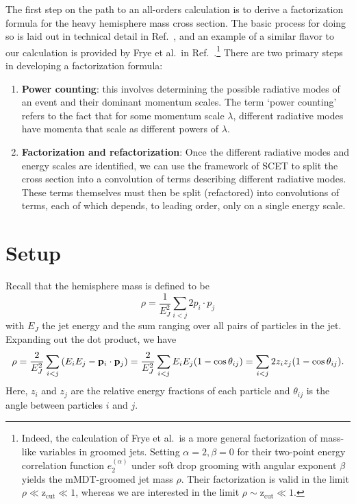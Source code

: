 \documentclass[12pt,twoside,class=../reedthesis, crop=false]{standalone}
\newcommand{\zcut}{\mathrm{z_{cut}}}
\begin{document}
	The first step on the path to an all-orders calculation is to derive a factorization formula for the heavy hemisphere mass cross section. The basic process for doing so is laid out in technical detail in Ref.~\cite{becher_introduction_2015-1}, and an example of a similar flavor to our calculation is provided by Frye et al.\ in Ref.~\cite{frye_factorization_2016}.\footnote{Indeed, the calculation of Frye et al.\ is a more general factorization of mass-like variables in groomed jets. Setting $\alpha = 2, \beta = 0$ for their two-point energy correlation function $e_2^{(\alpha)}$ under soft drop grooming with angular exponent $\beta$ yields the mMDT-groomed jet mass $\rho$. Their factorization is valid in the limit $\rho \ll \zcut \ll 1$, whereas we are interested in the limit $\rho \sim \zcut \ll 1$.} There are two primary steps in developing a factorization formula:
	\begin{enumerate}
		\item \textbf{Power counting}: this involves determining the possible radiative modes of an event and their dominant momentum scales. The term `power counting' refers to the fact that for some momentum scale $\lambda$, different radiative modes have momenta that scale as different powers of $\lambda$.

		\item \textbf{Factorization and refactorization}: Once the different radiative modes and energy scales are identified, we can use the framework of SCET to split the cross section into a convolution of terms describing different radiative modes. These terms themselves must then be split (refactored) into convolutions of terms, each of which depends, to leading order, only on a single energy scale.
	\end{enumerate}

\section{Setup}
	Recall that the hemisphere mass is defined to be
	\begin{equation}
		\rho = \frac{1}{E_J^2} \sum_{i<j} 2p_i \cdot p_j
	\end{equation}
	with $E_J$ the jet energy and the sum ranging over all pairs of particles in the jet. Expanding out the dot product, we have
	\begin{equation}\label{eq:jet mass z theta}
		\rho = \frac{2}{E_J^2} \sum_{i<j} \qty(E_i E_j - \vb{p}_i \cdot \vb{p}_j) = \frac{2}{E_J^2} \sum_{i<j} E_i E_j \qty(1 - \cos\theta_{ij}) = \sum_{i<j}2z_i z_j \qty(1 - \cos\theta_{ij}).
	\end{equation}
	Here, $z_i$ and $z_j$ are the relative energy fractions of each particle and $\theta_{ij}$ is the angle between particles $i$ and $j$.
\end{document}
